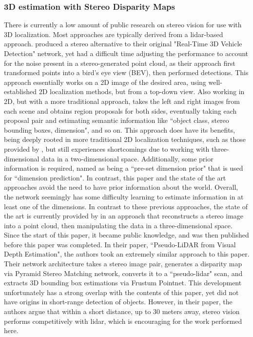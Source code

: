 \subsubsection{3D estimation with Stereo Disparity Maps}
There is currently a low amount of public research on stereo vision for use with 3D localization. Most approaches are typically derived from a lidar-based approach. \cite{zeng2018rt3d} produced a stereo alternative to their original "Real-Time 3D Vehicle Detection" network, yet had a difficult time adjusting the performance to account for the noise present in a stereo-generated point cloud, as their approach first transformed points into a bird's eye view (BEV), then performed detections. This approach essentially works on a 2D image of the desired area, using well-established 2D localization methods, but from a top-down view. Also working in 2D, but with a more traditional approach, \cite{li_stereo_2019} takes the left and right images from each scene and obtains region proposals for both sides, eventually taking each proposal pair and estimating semantic information like ``object class, stereo bounding boxes, dimension", and so on. This approach does have its benefits, being deeply rooted in more traditional 2D localization techniques, such as those provided by \cite{ren_faster_2015}, but still experiences shortcomings due to working with three-dimensional data in a two-dimensional space. Additionally, some prior information is required, named as being a ``pre-set dimension prior" that is used for ``dimension prediction". In contrast, this paper and the state of the art approaches avoid the need to have prior information about the world. Overall, the network seemingly has some difficulty learning to estimate information in at least one of the dimensions. In contrast to these previous approaches, the state of the art is currently provided by \cite{wang_pseudo-lidar_2019} in an approach that reconstructs a stereo image into a point cloud, then manipulating the data in a three-dimensional space. Since the start of this paper, it became public knowledge, and was then published before this paper was completed. In their paper, ``Pseudo-LiDAR from Visual Depth Estimation", the authors took an extremely similar approach to this paper. Their network architecture takes a stereo image pair, generates a disparity map via Pyramid Stereo Matching network, converts it to a ``pseudo-lidar" scan, and extracts 3D bounding box estimations via Frustum Pointnet. This development unfortunately has a strong overlap with the contents of this paper, yet did not have origins in short-range detection of objects. However, in their paper, the authors argue that within a short distance, up to 30 meters away, stereo vision performs competitively with lidar, which is encouraging for the work performed here.

